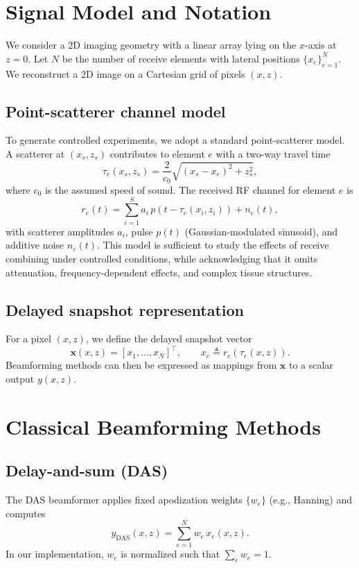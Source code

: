 \documentclass[conference]{IEEEtran}
\begin{document}
\section{Signal Model and Notation}
We consider a 2D imaging geometry with a linear array lying on the $x$-axis at $z=0$. Let $N$ be the number of receive elements with lateral positions $\{x_e\}_{e=1}^N$. We reconstruct a 2D image on a Cartesian grid of pixels $(x,z)$.

\subsection{Point-scatterer channel model}
To generate controlled experiments, we adopt a standard point-scatterer model. A scatterer at $(x_s,z_s)$ contributes to element $e$ with a two-way travel time
\begin{equation}
\tau_e(x_s,z_s) = \frac{2}{c_0}\sqrt{(x_s-x_e)^2+z_s^2},
\end{equation}
where $c_0$ is the assumed speed of sound. The received RF channel for element $e$ is
\begin{equation}
r_e(t) = \sum_{i=1}^{S} a_i\, p\!\left(t-\tau_e(x_i,z_i)\right) + n_e(t),
\end{equation}
with scatterer amplitudes $a_i$, pulse $p(t)$ (Gaussian-modulated sinusoid), and additive noise $n_e(t)$. This model is sufficient to study the effects of receive combining under controlled conditions, while acknowledging that it omits attenuation, frequency-dependent effects, and complex tissue structures.

\subsection{Delayed snapshot representation}
For a pixel $(x,z)$, we define the delayed snapshot vector
\begin{equation}
\mathbf{x}(x,z) = \left[x_1,\dots,x_N\right]^\top,\qquad x_e \triangleq r_e\!\left(\tau_e(x,z)\right).
\end{equation}
Beamforming methods can then be expressed as mappings from $\mathbf{x}$ to a scalar output $y(x,z)$.

\section{Classical Beamforming Methods}
\subsection{Delay-and-sum (DAS)}
The DAS beamformer applies fixed apodization weights $\{w_e\}$ (e.g., Hanning) and computes
\begin{equation}
y_{\mathrm{DAS}}(x,z) = \sum_{e=1}^N w_e\, x_e(x,z).
\end{equation}
In our implementation, $w_e$ is normalized such that $\sum_e w_e = 1$.
\end{document}
